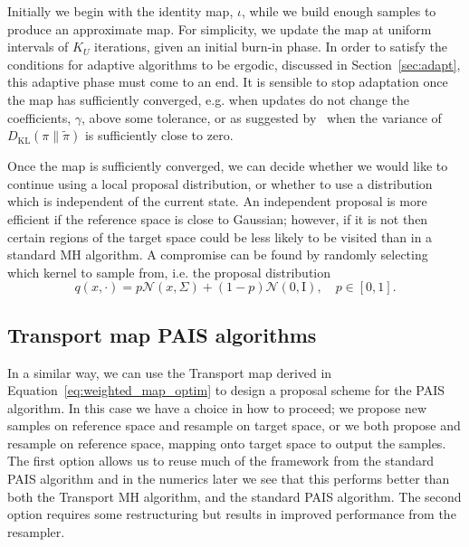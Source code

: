 \documentclass[final]{siamltex}
\begin{document}
Initially we begin with the identity map, $\iota$, while we build enough samples to produce an approximate
map. For simplicity, we update the map at uniform intervals of $K_U$ iterations, given an initial
burn-in phase. In order to satisfy the conditions for adaptive algorithms to be ergodic, discussed
in Section~\ref{sec:adapt}, this adaptive phase must come to an end. It is sensible to stop
adaptation once the map has sufficiently converged, e.g. when updates do not change the coefficients, $\gamma$,
above some tolerance, or as suggested by~\cite{parno2014transport} when the variance of $D_\text{KL}(\pi\|\tilde{\pi})$ is sufficiently close to zero.

Once the map is sufficiently converged, we can decide whether we would like to continue using a local proposal distribution, or whether to use a distribution which is independent of the current state. An independent proposal is more efficient
if the reference space is close to Gaussian; however, if it is not then certain regions of the target
space could be less likely to be visited than in a standard MH algorithm. A compromise can be found by randomly selecting which kernel to sample from, i.e. the proposal distribution
\[
	q(x, \cdot) = p\mathcal{N}(x, \Sigma)+(1-p)\mathcal{N}(0,\text{I}), \quad p \in [0, 1].
\]

\subsection{Transport map PAIS algorithms}

In a similar way, we can use the Transport map derived in Equation~\eqref{eq:weighted_map_optim} to
design a proposal scheme for the PAIS algorithm. In this case we have a choice in how to proceed; we
propose new samples on reference space and resample on target space, or we both propose and resample on reference space, mapping onto target space to output the samples. The first option allows us to reuse much of the framework
from the standard PAIS algorithm and in the numerics later we see that this performs better than
both the Transport MH algorithm, and the standard PAIS algorithm. The second option requires some
restructuring but results in improved performance from the resampler.
\end{document}
